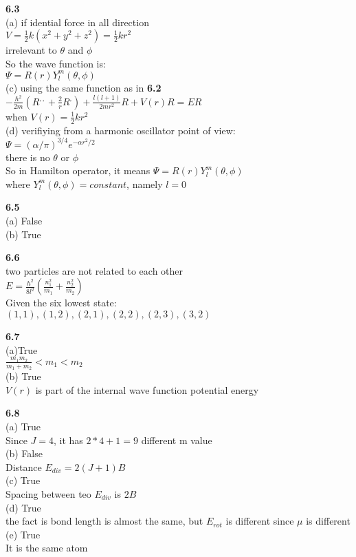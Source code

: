 \documentclass{article}
\begin{document}
\textbf{6.3}\\
(a) if idential force in all direction\\
$V = \frac{1}{2}k(x^2+y^2+z^2) = \frac{1}{2}kr^2$\\
irrelevant to $\theta$ and $\phi$\\
So the wave function is:\\
$\Psi = R(r)Y^m_l(\theta, \phi)$\\
(c) using the same function as in \textbf{6.2}\\
$-\frac{\hbar^2}{2m}(R^{,,}+\frac{2}{r}R^,)+\frac{l(l+1)}{2mr^2}R+V(r)R = ER$\\
when $V(r) = \frac{1}{2}kr^2$\\
(d) verifiying from a harmonic oscillator point of view:\\
$\Psi = (\alpha/\pi)^{3/4}e^{-\alpha r^2/2}$\\
there is no $\theta$ or $\phi$\\
So in Hamilton operator, it means $\Psi = R(r)Y^m_l(\theta,\phi)$\\
where $Y^m_l(\theta,\phi) = constant$, namely $l = 0$\\
\newline

\textbf{6.5}\\
(a) False\\
(b) True\\
\newline

\textbf{6.6}\\
two particles are not related to each other\\
$E = \frac{h^2}{8l^2}(\frac{n_1^2}{m_1}+\frac{n_2^2}{m_2})$\\
Given the six lowest state:\\
$(1,1), (1,2),(2,1),(2,2),(2,3),(3,2)$\\
\newline

\textbf{6.7}\\
(a)True\\
$\frac{m_1m_2}{m_1+m_2} < m_1 < m_2$\\
(b) True\\
$V(r)$ is part of the internal wave function potential energy\\
\newline

\textbf{6.8}\\
(a) True\\
Since $J = 4$, it has $2*4+1=9$ different m value\\
(b) False\\
Distance $E_{div} = 2(J+1)B$\\
(c) True\\
Spacing between teo $E_{div}$ is $2B$\\
(d) True\\
the fact is bond length is almost the same, but $E_{rot}$ is different since $\mu$ is different\\
(e) True\\
It is the same atom\\
\newline
\end{document}
